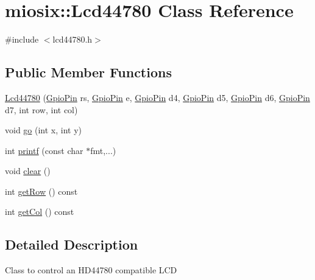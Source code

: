 \hypertarget{classmiosix_1_1_lcd44780}{\section{miosix\-:\-:Lcd44780 Class Reference}
\label{classmiosix_1_1_lcd44780}
}


{\ttfamily \#include $<$lcd44780.\-h$>$}

\subsection*{Public Member Functions}
\begin{DoxyCompactItemize}
\item 
\hyperlink{classmiosix_1_1_lcd44780_a0abfd74ae3a2a360fa9a8d338d0580a4}{Lcd44780} (\hyperlink{classmiosix_1_1_gpio_pin}{Gpio\-Pin} rs, \hyperlink{classmiosix_1_1_gpio_pin}{Gpio\-Pin} e, \hyperlink{classmiosix_1_1_gpio_pin}{Gpio\-Pin} d4, \hyperlink{classmiosix_1_1_gpio_pin}{Gpio\-Pin} d5, \hyperlink{classmiosix_1_1_gpio_pin}{Gpio\-Pin} d6, \hyperlink{classmiosix_1_1_gpio_pin}{Gpio\-Pin} d7, int row, int col)
\item 
void \hyperlink{classmiosix_1_1_lcd44780_a32b5acd0269923726beca065af5c1f56}{go} (int x, int y)
\item 
int \hyperlink{classmiosix_1_1_lcd44780_a1cb9c5dfb614e13c381850dc3c1313b8}{printf} (const char $\ast$fmt,...)
\item 
void \hyperlink{classmiosix_1_1_lcd44780_a9b7b612642e4fe208cffcd5b342cdfdc}{clear} ()
\item 
int \hyperlink{classmiosix_1_1_lcd44780_aa584673eb9867c35ae94788087c2e745}{get\-Row} () const 
\item 
int \hyperlink{classmiosix_1_1_lcd44780_a9d1c3c57953cd442ea248aba65edc88e}{get\-Col} () const 
\end{DoxyCompactItemize}


\subsection{Detailed Description}
Class to control an H\-D44780 compatible L\-C\-D 

